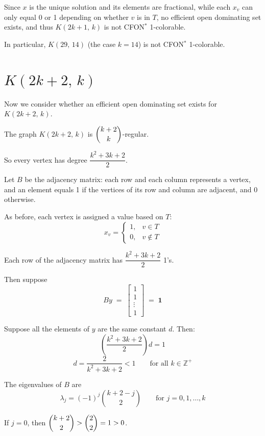 \documentclass[11pt]{article}
\begin{document}
Since $x$ is the unique solution and its elements are fractional, while each
$x_v$ can only equal 0 or 1 depending on whether $v$ is in $T$, no efficient
open dominating set exists, and thus $K(2k+1,\,k)$ is not CFON$^{*}$
1-colorable.

In particular, $K(29,\,14)$ (the case $k = 14$) is not CFON$^{*}$ 1-colorable.

\section{$K(2k+2,\,k)$}

Now we consider whether an efficient open dominating set exists for
$K(2k+2,\,k)$.

The graph $K(2k+2,\,k)$ is $\dbinom{k+2}{k}$-regular.

So every vertex has degree $\dfrac{k^2+3k+2}{2}$.

Let $B$ be the adjacency matrix: each row and each column represents a vertex,
and an element equals 1 if the vertices of its row and column are adjacent,
and 0 otherwise.

As before, each vertex is assigned a value based on $T$:
\[
  x_v =
  \begin{cases}
    1, & v \in T\\
    0, & v \notin T
  \end{cases}
\]

Each row of the adjacency matrix has $\dfrac{k^2+3k+2}{2}$ 1's.

Then suppose
\[
  By \;=\; \begin{bmatrix} 1 \\ 1 \\ \vdots \\ 1 \end{bmatrix} \;=\; \mathbf{1}
\]

Suppose all the elements of $y$ are the same constant $d$. Then:
\[
  \left( \frac{k^2+3k+2}{2} \right) d = 1
\]
\[
  d = \frac{2}{k^2+3k+2} < 1 \qquad \text{for all } k \in \mathbb{Z}^{+}
\]

The eigenvalues of $B$ are
\[
  \lambda_j = (-1)^j \binom{k+2-j}{2} \qquad \text{for } j = 0, 1, \dots, k
\]

If $j = 0$, then $\dbinom{k+2}{2} > \dbinom{2}{2} = 1 > 0$.
\end{document}
